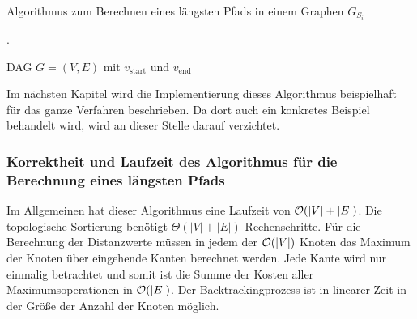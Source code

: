 \begin{breakablealgorithm}
	\caption{Algorithmus zum Berechnen eines längsten Pfads in einem Graphen $G_{S_i}$}.
	\label{alg:longestpath}
	\begin{algorithmic}[1]
		\Require DAG $G = (V,E)$ mit $v_{\mathrm{start}}$ und $v_{\mathrm{end}}$
			 
					\EndIf
				\EndFor
			\EndWhile
			 	
			 
			\EndWhile
		\EndProcedure
	\end{algorithmic}
\end{breakablealgorithm}

Im nächsten Kapitel wird die Implementierung dieses Algorithmus beispielhaft für das ganze Verfahren beschrieben. Da dort auch ein konkretes Beispiel behandelt wird, wird an dieser Stelle darauf verzichtet.

\subsubsection{Korrektheit und Laufzeit des Algorithmus für die Berechnung eines längsten Pfads}


Im Allgemeinen hat dieser Algorithmus eine Laufzeit von $\mathcal{O}(|V| + |E|)$. Die topologische Sortierung benötigt $\Theta(|V| + |E|)$ Rechenschritte. Für die Berechnung der Distanzwerte müssen in jedem der $\mathcal{O}(|V|)$ Knoten das Maximum der Knoten über eingehende Kanten berechnet werden. Jede Kante wird nur einmalig betrachtet und somit ist die Summe der Kosten aller Maximumsoperationen in $\mathcal{O}(|E|)$. Der Backtrackingprozess ist in linearer Zeit in der Größe der Anzahl der Knoten möglich.

